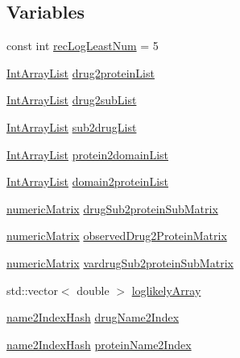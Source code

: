 \subsection*{Variables}
\begin{DoxyCompactItemize}
\item 
const int \hyperlink{namespacegift_ab632fcb7ab144fdde38c5a4154e2b5b7}{rec\+Log\+Least\+Num} = 5
\item 
\hyperlink{namespacegift_a98b589c33d80e413fceaf8afd8e25815}{Int\+Array\+List} \hyperlink{namespacegift_a2c0005015565d7432dd64fd6bafd3395}{drug2protein\+List}
\item 
\hyperlink{namespacegift_a98b589c33d80e413fceaf8afd8e25815}{Int\+Array\+List} \hyperlink{namespacegift_a73506f6b6bc3e6f6fedfacf8bf0d38f1}{drug2sub\+List}
\item 
\hyperlink{namespacegift_a98b589c33d80e413fceaf8afd8e25815}{Int\+Array\+List} \hyperlink{namespacegift_afcc3e6429fa4fef47fb34e30d2f0c6c4}{sub2drug\+List}
\item 
\hyperlink{namespacegift_a98b589c33d80e413fceaf8afd8e25815}{Int\+Array\+List} \hyperlink{namespacegift_aa113a7a90b1c3c70d1ab252eb34816fe}{protein2domain\+List}
\item 
\hyperlink{namespacegift_a98b589c33d80e413fceaf8afd8e25815}{Int\+Array\+List} \hyperlink{namespacegift_ac99bcb1b736637f97e82be7503c725b5}{domain2protein\+List}
\item 
\hyperlink{namespacegift_a4e11987023733fe14bdabd0b52e78583}{numeric\+Matrix} \hyperlink{namespacegift_ae49d782c144d39543cd6504f5e7d9c7a}{drug\+Sub2protein\+Sub\+Matrix}
\item 
\hyperlink{namespacegift_a4e11987023733fe14bdabd0b52e78583}{numeric\+Matrix} \hyperlink{namespacegift_ad84dd6f05c58f2f2061db7ab70bd5471}{observed\+Drug2\+Protein\+Matrix}
\item 
\hyperlink{namespacegift_a4e11987023733fe14bdabd0b52e78583}{numeric\+Matrix} \hyperlink{namespacegift_a7191203810c7c52faceb69ac903e7899}{vardrug\+Sub2protein\+Sub\+Matrix}
\item 
std\+::vector$<$ double $>$ \hyperlink{namespacegift_ac31667d9b67b35a70ac9d46dfe6a7967}{loglikely\+Array}
\item 
\hyperlink{namespacegift_a88a96011620ed18b8321bc36a816773c}{name2\+Index\+Hash} \hyperlink{namespacegift_a3385bc2f0aa26289e7f7d69635207e5d}{drug\+Name2\+Index}
\item 
\hyperlink{namespacegift_a88a96011620ed18b8321bc36a816773c}{name2\+Index\+Hash} \hyperlink{namespacegift_ad49c613c81da3c4189ea4f16915c60c5}{protein\+Name2\+Index}

\end{DoxyCompactItemize}
